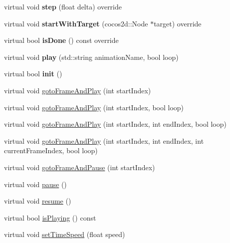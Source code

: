 \begin{DoxyCompactItemize}
\mbox{\label{classActionTimeline_a61a481a9046147404abd1a0278b5fb89}} 
virtual void {\bfseries step} (float delta) override
\item 
\mbox{\label{classActionTimeline_a6f7cff28686e0ce94fbc15f908153beb}} 
virtual void {\bfseries start\+With\+Target} (cocos2d\+::\+Node $\ast$target) override
\item 
\mbox{\label{classActionTimeline_a60cfc77726fa9a506daba6fa87cd7729}} 
virtual bool {\bfseries is\+Done} () const override
\item 
\mbox{\label{classActionTimeline_aa709e7227767df354fa8a73a102c76fc}} 
virtual void {\bfseries play} (std\+::string animation\+Name, bool loop)
\item 
\mbox{\label{classActionTimeline_aa546d0bea8c0ea142a1555ae9f72957b}} 
virtual bool {\bfseries init} ()
\item 
virtual void \hyperlink{classActionTimeline_a4c39309a984768663040e516163674f7}{goto\+Frame\+And\+Play} (int start\+Index)
\item 
virtual void \hyperlink{classActionTimeline_a1b665a45f28035f111924f55566dd17a}{goto\+Frame\+And\+Play} (int start\+Index, bool loop)
\item 
virtual void \hyperlink{classActionTimeline_ad71cc84cd83f8d3e386c097a222ee69d}{goto\+Frame\+And\+Play} (int start\+Index, int end\+Index, bool loop)
\item 
virtual void \hyperlink{classActionTimeline_a0214beaa238eec4fd640e7341f383fc0}{goto\+Frame\+And\+Play} (int start\+Index, int end\+Index, int current\+Frame\+Index, bool loop)
\item 
virtual void \hyperlink{classActionTimeline_a6ab7b14ad833b3382503236c07933d13}{goto\+Frame\+And\+Pause} (int start\+Index)
\item 
virtual void \hyperlink{classActionTimeline_aff80867e59c9974e2644e4e868a71e39}{pause} ()
\item 
virtual void \hyperlink{classActionTimeline_a24c8bfe9480ca2b99ee6cd44e4ab8307}{resume} ()
\item 
virtual bool \hyperlink{classActionTimeline_a1620d0953526f8e060c04338c5914321}{is\+Playing} () const
\item 
virtual void \hyperlink{classActionTimeline_a24ba56fd33efc2bc0d0a4fc31e4043d6}{set\+Time\+Speed} (float speed)

\end{DoxyCompactItemize}
